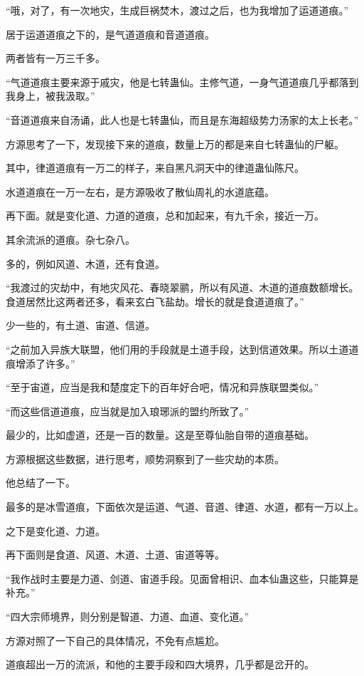 \begin{this_body}
“哦，对了，有一次地灾，生成巨祸焚木，渡过之后，也为我增加了运道道痕。”

居于运道道痕之下的，是气道道痕和音道道痕。

两者皆有一万三千多。

“气道道痕主要来源于戚灾，他是七转蛊仙。主修气道，一身气道道痕几乎都落到我身上，被我汲取。”

“音道道痕来自汤诵，此人也是七转蛊仙，而且是东海超级势力汤家的太上长老。”

方源思考了一下，发现接下来的道痕，数量上万的都是来自七转蛊仙的尸躯。

其中，律道道痕有一万二的样子，来自黑凡洞天中的律道蛊仙陈尺。

水道道痕在一万一左右，是方源吸收了散仙周礼的水道底蕴。

再下面。就是变化道、力道的道痕，总和加起来，有九千余，接近一万。

其余流派的道痕。杂七杂八。

多的，例如风道、木道，还有食道。

“我渡过的灾劫中，有地灾风花、春晓翠鹂，所以有风道、木道的道痕数额增长。食道居然比这两者还多，看来玄白飞盐劫。增长的就是食道道痕了。”

少一些的，有土道、宙道、信道。

“之前加入异族大联盟，他们用的手段就是土道手段，达到信道效果。所以土道道痕增添了许多。”

“至于宙道，应当是我和楚度定下的百年好合吧，情况和异族联盟类似。”

“而这些信道道痕，应当就是加入琅琊派的盟约所致了。”

最少的，比如虚道，还是一百的数量。这是至尊仙胎自带的道痕基础。

方源根据这些数据，进行思考，顺势洞察到了一些灾劫的本质。

他总结了一下。

最多的是冰雪道痕，下面依次是运道、气道、音道、律道、水道，都有一万以上。

之下是变化道、力道。

再下面则是食道、风道、木道、土道、宙道等等。

“我作战时主要是力道、剑道、宙道手段。见面曾相识、血本仙蛊这些，只能算是补充。”

“四大宗师境界，则分别是智道、力道、血道、变化道。”

方源对照了一下自己的具体情况，不免有点尴尬。

道痕超出一万的流派，和他的主要手段和四大境界，几乎都是岔开的。


\end{this_body}
